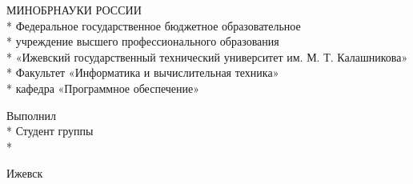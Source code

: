 \begin{frame}

\newcommand{\mytitlefont}{\fontsize{6pt}{7.2}\selectfont}

\begin{center}
\mytitlefont
МИНОБРНАУКИ РОССИИ\\*
Федеральное государственное бюджетное образовательное\\*
учреждение высшего профессионального образования\\*
«Ижевский государственный технический университет им. М. Т. Калашникова»\\*
Факультет «Информатика и вычислительная техника»\\*
кафедра «Программное обеспечение»
\vspace{1cm}
\end{center}

\vspace{2em}

\mytitlefont
\begin{center}
\mytitlefont
\titletext
\end{center}

\vspace{2.5em}

\ifdefmacro{\myvariant}{
    \begin{center}
        \mytitlefont
        Вариант №\myvariant
    \end{center}
}{
    \vspace{3em}
}
\vspace{2em}

\begin{flushleft}
    \mytitlefont
    Выполнил\\*
    Студент группы \mygroup \hfill \myname\\*
    \vspace{1.5em}
\ifdefmacro{\myteacherdegree}{
    \myteacherlabel \\*
    \myteacherdegree \hfill \myteacher\\*
}{
    \mytitlefont
    \myteacherlabel \hfill \myteacher\\*
}
\end{flushleft}

\vspace{\fill}

\begin{center}
    \mytitlefont
    Ижевск \myyear
\end{center}

\end{frame}
